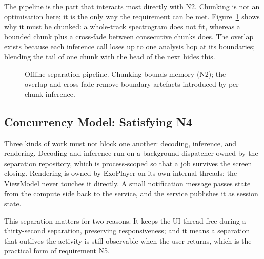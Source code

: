 \documentclass[letterpaper]{article} %
\begin{document}
The pipeline is the part that interacts most directly with N2. Chunking is not
an optimisation here; it is the only way the requirement can be met.
Figure~\ref{fig:pipe} shows why it must be chunked: a whole-track spectrogram
does not fit, whereas a bounded chunk plus a cross-fade between consecutive
chunks does. The overlap exists because each inference call loses up to one
analysis hop at its boundaries; blending the tail of one chunk with the head of
the next hides this.

\begin{figure}[t]
\centering
{}
\caption{Offline separation pipeline. Chunking bounds memory (N2); the overlap
and cross-fade remove boundary artefacts introduced by per-chunk inference.}
\label{fig:pipe}
\end{figure}

\subsection{Concurrency Model: Satisfying N4}

Three kinds of work must not block one another: decoding, inference, and
rendering. Decoding and inference run on a background dispatcher owned by the
separation repository, which is process-scoped so that a job survives the
screen closing. Rendering is owned by ExoPlayer on its own internal threads;
the ViewModel never touches it directly. A small notification message passes
state from the compute side back to the service, and the service publishes it
as session state.

This separation matters for two reasons. It keeps the UI thread free during a
thirty-second separation, preserving responsiveness; and it means a
separation that outlives the activity is still observable when the user
returns, which is the practical form of requirement N5.
\end{document}
